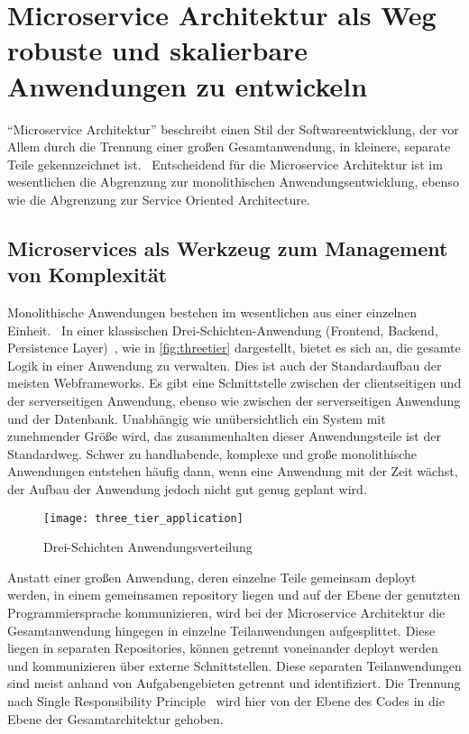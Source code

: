 \chapter{Microservice Architektur als Weg robuste und skalierbare Anwendungen zu entwickeln}
``Microservice Architektur'' beschreibt einen Stil der Softwareentwicklung, der vor Allem durch die Trennung einer großen Gesamtanwendung, in kleinere, separate Teile gekennzeichnet ist.~\cite[vgl.][Seite 2]{newman2015building}
Entscheidend für die Microservice Architektur ist im wesentlichen die Abgrenzung zur monolithischen Anwendungsentwicklung, ebenso wie die Abgrenzung zur Service Oriented Architecture.

\section{Microservices als Werkzeug zum Management von Komplexität}
Monolithische Anwendungen bestehen im wesentlichen aus einer einzelnen Einheit.~\cite[vgl.][]{Fowler:Intro} In einer klassischen Drei-Schichten-Anwendung (Frontend, Backend, Persistence Layer)~\cite[vgl.][]{MSDN:TTA}, wie in \autoref{fig:threetier} dargestellt, bietet es sich an, die gesamte Logik in einer Anwendung zu verwalten. Dies ist auch der Standardaufbau der meisten Webframeworks. Es gibt eine Schnittstelle zwischen der clientseitigen und der serverseitigen Anwendung, ebenso wie zwischen der serverseitigen Anwendung und der Datenbank. Unabhängig wie unübersichtlich ein System mit zunehmender Größe wird, das zusammenhalten dieser Anwendungsteile ist der Standardweg. Schwer zu handhabende, komplexe und große monolithische Anwendungen entstehen häufig dann, wenn eine Anwendung mit der Zeit wächst, der Aufbau der Anwendung jedoch nicht gut genug geplant wird.~\cite[vgl.][]{infaktuell}
\begin{figure}[!ht]
    \caption{Drei-Schichten Anwendungsverteilung \cite{ThreeTieredDistribution}}
    \label{fig:threetier}
    \texttt{[image: three\_tier\_application]}
\end{figure}

Anstatt einer großen Anwendung, deren einzelne Teile gemeinsam deployt werden, in einem gemeinsamen repository liegen und auf der Ebene der genutzten Programmiersprache kommunizieren, wird bei der Microservice Architektur die Gesamtanwendung hingegen in einzelne Teilanwendungen aufgesplittet. Diese liegen in separaten Repositories, können getrennt voneinander deployt werden und kommunizieren über externe Schnittstellen. Diese separaten Teilanwendungen sind meist anhand von Aufgabengebieten getrennt und identifiziert. Die Trennung nach Single Responsibility Principle~\cite[vgl.][Seite 108]{Martin:SRP} wird hier von der Ebene des Codes in die Ebene der Gesamtarchitektur gehoben.

